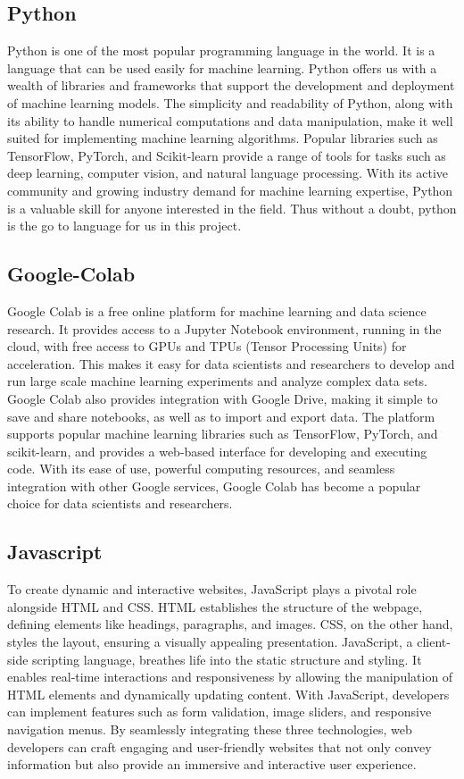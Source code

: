 \subsection{Python}
Python is one of the most popular programming language in the world. It is a language 
that can be used easily for machine learning. Python offers us with a wealth of libraries 
and frameworks that support the development and deployment of machine learning 
models. The simplicity and readability of Python, along with its ability to handle 
numerical computations and data manipulation, make it well suited for implementing 
machine learning algorithms. Popular libraries such as TensorFlow, PyTorch, and 
Scikit-learn provide a range of tools for tasks such as deep learning, computer vision, 
and natural language processing. With its active community and growing industry 
demand for machine learning expertise, Python is a valuable skill for anyone interested 
in the field. Thus without a doubt, python is the go to language for us in this project.
\subsection{Google-Colab}
Google Colab is a free online platform for machine learning and data science research. 
It provides access to a Jupyter Notebook environment, running in the cloud, with free 
access to GPUs and TPUs (Tensor Processing Units) for acceleration. This makes it 
easy for data scientists and researchers to develop and run large scale machine learning 
experiments and analyze complex data sets. Google Colab also provides integration 
with Google Drive, making it simple to save and share notebooks, as well as to import 
and export data. The platform supports popular machine learning libraries such as 
TensorFlow, PyTorch, and scikit-learn, and provides a web-based interface for 
developing and executing code. With its ease of use, powerful computing resources, 
and seamless integration with other Google services, Google Colab has become a 
popular choice for data scientists and researchers.

\subsection{Javascript}
To create dynamic and interactive websites, JavaScript plays a pivotal role alongside HTML and CSS. HTML establishes the structure of the webpage, defining elements like headings, paragraphs, and images. CSS, on the other hand, styles the layout, ensuring a visually appealing presentation. JavaScript, a client-side scripting language, breathes life into the static structure and styling. It enables real-time interactions and responsiveness by allowing the manipulation of HTML elements and dynamically updating content. With JavaScript, developers can implement features such as form validation, image sliders, and responsive navigation menus. By seamlessly integrating these three technologies, web developers can craft engaging and user-friendly websites that not only convey information but also provide an immersive and interactive user experience.

